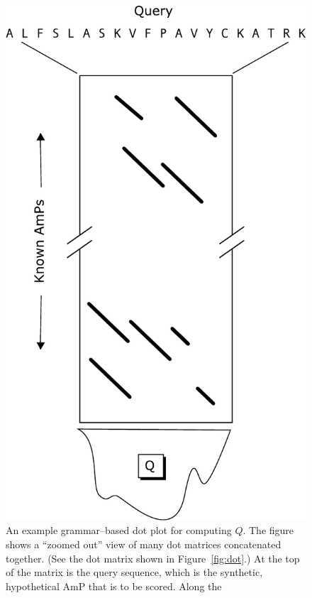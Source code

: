         \begin{figure}[ptb]
        \centering
        \includegraphics{Body/Images-chap2/dot2.pdf}
        \caption[Example  grammar--based dot plot for computing $Q$]{
            An example  grammar--based dot plot for computing $Q$.
            The figure shows a ``zoomed out'' view of many dot
            matrices concatenated together.  (See the dot matrix
            shown in  Figure~\vref{fig:dot}.)  At the top of the
            matrix is the query sequence, which is the synthetic,
            hypothetical AmP that is to be scored.  Along the
}
\end{figure}
